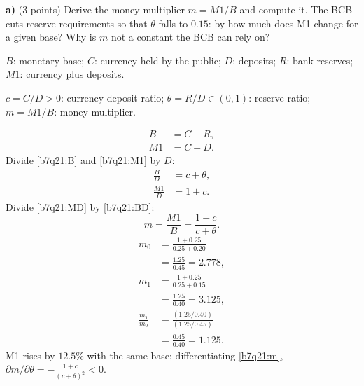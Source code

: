 
\textbf{a)} (3 points) Derive the money multiplier $m=M1/B$ and compute it. The BCB cuts reserve requirements so that $\theta$ falls to
$0.15$: by how much does M1 change for a given base? Why is $m$ not a constant the BCB can rely on?
\resolespaco
\begin{sol}
\begin{notacao}
\item $B$: monetary base; $C$: currency held by the public; $D$: deposits; $R$: bank reserves; $M1$: currency plus deposits.
\item $c=C/D>0$: currency-deposit ratio; $\theta=R/D\in(0,1)$: reserve ratio; $m=M1/B$: money multiplier.
\end{notacao}
\begin{align}
B&=C+R, \label{b7q21:B}\\
M1&=C+D. \label{b7q21:M1}
\end{align}
Divide \eqref{b7q21:B} and \eqref{b7q21:M1} by $D$:
\begin{align}
\frac BD&=c+\theta, \label{b7q21:BD}\\
\frac{M1}D&=1+c. \label{b7q21:MD}
\end{align}
Divide \eqref{b7q21:MD} by \eqref{b7q21:BD}:
\begin{equation}
m=\frac{M1}{B}=\frac{1+c}{c+\theta}. \label{b7q21:m}
\end{equation}
\begin{align*}
m_0&=\frac{1+0.25}{0.25+0.20}\\
&=\frac{1.25}{0.45}=2.778,\\
m_1&=\frac{1+0.25}{0.25+0.15}\\
&=\frac{1.25}{0.40}=3.125,\\
\frac{m_1}{m_0}&=\frac{(1.25/0.40)}{(1.25/0.45)}\\
&=\frac{0.45}{0.40}=1.125 .
\end{align*}
M1 rises by $12.5\%$ with the same base; differentiating \eqref{b7q21:m}, $\partial m/\partial\theta=-\frac{1+c}{(c+\theta)^2}<0$.
\end{sol}

